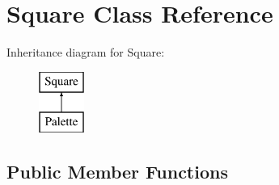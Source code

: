 \hypertarget{class_square}{}\section{Square Class Reference}
\label{class_square}
Inheritance diagram for Square\+:\begin{figure}[H]
\begin{center}
\leavevmode
\includegraphics[height=2.000000cm]{class_square}
\end{center}
\end{figure}
\subsection*{Public Member Functions}
